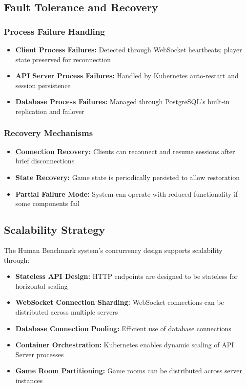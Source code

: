 \subsection{Fault Tolerance and Recovery}

\subsubsection{Process Failure Handling}

\begin{itemize}
    \item \textbf{Client Process Failures:} Detected through WebSocket heartbeats; player state preserved for reconnection
    \item \textbf{API Server Process Failures:} Handled by Kubernetes auto-restart and session persistence
    \item \textbf{Database Process Failures:} Managed through PostgreSQL's built-in replication and failover
\end{itemize}

\subsubsection{Recovery Mechanisms}

\begin{itemize}
    \item \textbf{Connection Recovery:} Clients can reconnect and resume sessions after brief disconnections
    \item \textbf{State Recovery:} Game state is periodically persisted to allow restoration
    \item \textbf{Partial Failure Mode:} System can operate with reduced functionality if some components fail
\end{itemize}

\subsection{Scalability Strategy}

The Human Benchmark system's concurrency design supports scalability through:

\begin{itemize}
    \item \textbf{Stateless API Design:} HTTP endpoints are designed to be stateless for horizontal scaling
    \item \textbf{WebSocket Connection Sharding:} WebSocket connections can be distributed across multiple servers
    \item \textbf{Database Connection Pooling:} Efficient use of database connections
    \item \textbf{Container Orchestration:} Kubernetes enables dynamic scaling of API Server processes
    \item \textbf{Game Room Partitioning:} Game rooms can be distributed across server instances
\end{itemize}

